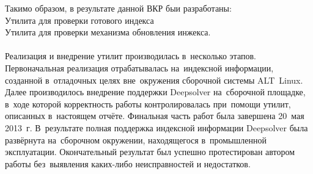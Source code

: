 \documentclass[a4paper]{article}
\begin{document}
\newpage
Такимо образом, в результате данной ВКР быи разработаны:\\
Утилита для проверки готового индекса\\
Утилита для проверки механизма обновления инжекса.\\
\\
Реализация и внедрение утилит производилась в~несколько этапов. 
Первоначальная реализация отрабатывалась на~индексной информации, созданной в~отладочных целях вне~окружения сборочной системы ALT~Linux.
Далее производилось внедрение поддержки Deepsolver на~сборочной площадке,
в~ходе которой корректность работы контролировалась при~помощи утилит, описанных в~настоящем отчёте.
Финальная часть работ была завершена 20~мая 2013~г.
В~результате полная поддержка индексной информации Deepsolver была развёрнута на~сборочном окружении, 
находящегося в~промышленной эксплуатации.
Окончательный результат был успешно протестирован автором работы
без~выявления каких-либо неисправностей и недостатков.
\end{document}
